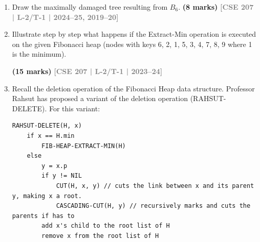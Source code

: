 \documentclass[12pt]{article}
\newcommand{\yr}[1]{\hfill\textcolor{gray}{\small\textbf{[#1]}}}
\newcommand{\mk}[1]{\textcolor{orange!70!black}{\small\textbf{(#1 marks)}}}
\begin{document}
\begin{enumerate}
\begin{center}
\begin{tikzpicture}[
        scale=1.1,
        every node/.style={circle, draw=black, ultra thick, minimum size=0.7cm, inner sep=0pt, font=\bfseries},
        thick
    ]
    \end{tikzpicture}
\end{center}

\mk{12} \yr{CSE 207 | L-2/T-1 | 2024--25}


\item Draw the maximally damaged tree resulting from $B_6$.
\mk{8} \yr{CSE 207 | L-2/T-1 | 2024--25, 2019--20}


\item Illustrate step by step what happens if the Extract-Min operation is executed on the given Fibonacci heap (nodes with keys 6, 2, 1, 5, 3, 4, 7, 8, 9 where 1 is the minimum).

\begin{center}
\end{center}

\mk{15} \yr{CSE 207 | L-2/T-1 | 2023--24}


\item Recall the deletion operation of the Fibonacci Heap data structure. Professor Rahsut has proposed a variant of the deletion operation (RAHSUT-DELETE). For this variant:

\begin{lstlisting}
RAHSUT-DELETE(H, x)
    if x == H.min
        FIB-HEAP-EXTRACT-MIN(H)
    else
        y = x.p
        if y != NIL
            CUT(H, x, y) // cuts the link between x and its parent y, making x a root.
            CASCADING-CUT(H, y) // recursively marks and cuts the parents if has to
        add x's child to the root list of H
        remove x from the root list of H
\end{lstlisting}


\end{enumerate}
\end{document}
